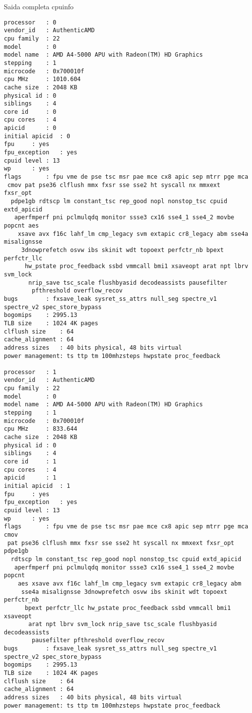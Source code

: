 \documentclass[11pt]{article}
\begin{document}
      \newpage
      Saida completa cpuinfo\\
      \begin{tiny}
        \begin{verbatim}
processor	: 0
vendor_id	: AuthenticAMD
cpu family	: 22
model		: 0
model name	: AMD A4-5000 APU with Radeon(TM) HD Graphics
stepping	: 1
microcode	: 0x700010f
cpu MHz		: 1010.604
cache size	: 2048 KB
physical id	: 0
siblings	: 4
core id		: 0
cpu cores	: 4
apicid		: 0
initial apicid	: 0
fpu		: yes
fpu_exception	: yes
cpuid level	: 13
wp		: yes
flags		: fpu vme de pse tsc msr pae mce cx8 apic sep mtrr pge mca
 cmov pat pse36 clflush mmx fxsr sse sse2 ht syscall nx mmxext fxsr_opt
  pdpe1gb rdtscp lm constant_tsc rep_good nopl nonstop_tsc cpuid extd_apicid
   aperfmperf pni pclmulqdq monitor ssse3 cx16 sse4_1 sse4_2 movbe popcnt aes
    xsave avx f16c lahf_lm cmp_legacy svm extapic cr8_legacy abm sse4a misalignsse
     3dnowprefetch osvw ibs skinit wdt topoext perfctr_nb bpext perfctr_llc
      hw_pstate proc_feedback ssbd vmmcall bmi1 xsaveopt arat npt lbrv svm_lock
       nrip_save tsc_scale flushbyasid decodeassists pausefilter
        pfthreshold overflow_recov
bugs		: fxsave_leak sysret_ss_attrs null_seg spectre_v1 spectre_v2 spec_store_bypass
bogomips	: 2995.13
TLB size	: 1024 4K pages
clflush size	: 64
cache_alignment	: 64
address sizes	: 40 bits physical, 48 bits virtual
power management: ts ttp tm 100mhzsteps hwpstate proc_feedback

processor	: 1
vendor_id	: AuthenticAMD
cpu family	: 22
model		: 0
model name	: AMD A4-5000 APU with Radeon(TM) HD Graphics
stepping	: 1
microcode	: 0x700010f
cpu MHz		: 833.644
cache size	: 2048 KB
physical id	: 0
siblings	: 4
core id		: 1
cpu cores	: 4
apicid		: 1
initial apicid	: 1
fpu		: yes
fpu_exception	: yes
cpuid level	: 13
wp		: yes
flags		: fpu vme de pse tsc msr pae mce cx8 apic sep mtrr pge mca cmov
 pat pse36 clflush mmx fxsr sse sse2 ht syscall nx mmxext fxsr_opt pdpe1gb
  rdtscp lm constant_tsc rep_good nopl nonstop_tsc cpuid extd_apicid
   aperfmperf pni pclmulqdq monitor ssse3 cx16 sse4_1 sse4_2 movbe popcnt
    aes xsave avx f16c lahf_lm cmp_legacy svm extapic cr8_legacy abm
     sse4a misalignsse 3dnowprefetch osvw ibs skinit wdt topoext perfctr_nb
      bpext perfctr_llc hw_pstate proc_feedback ssbd vmmcall bmi1 xsaveopt
       arat npt lbrv svm_lock nrip_save tsc_scale flushbyasid decodeassists
        pausefilter pfthreshold overflow_recov
bugs		: fxsave_leak sysret_ss_attrs null_seg spectre_v1 spectre_v2 spec_store_bypass
bogomips	: 2995.13
TLB size	: 1024 4K pages
clflush size	: 64
cache_alignment	: 64
address sizes	: 40 bits physical, 48 bits virtual
power management: ts ttp tm 100mhzsteps hwpstate proc_feedback


\end{verbatim}
\end{tiny}
\end{document}
